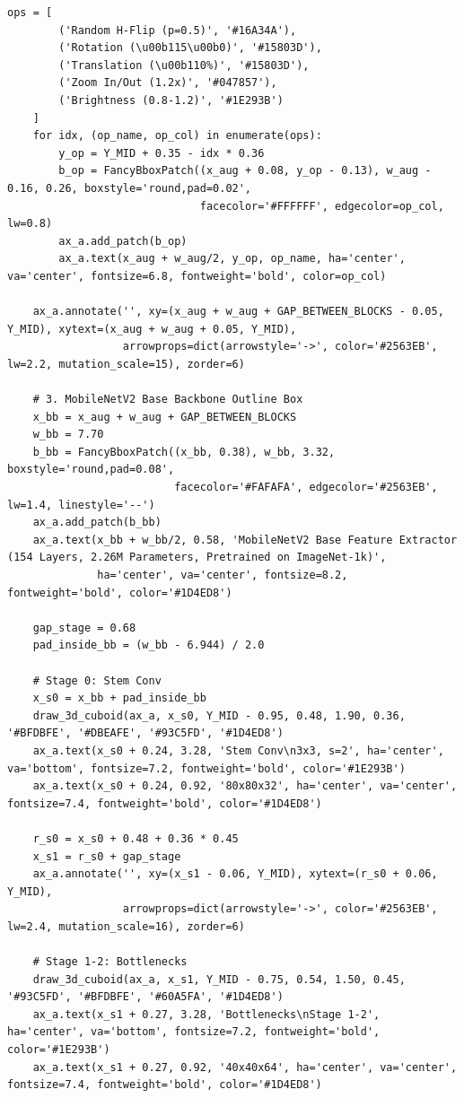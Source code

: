 \begin{lstlisting}[style=pycode]
    ops = [
        ('Random H-Flip (p=0.5)', '#16A34A'),
        ('Rotation (\u00b115\u00b0)', '#15803D'),
        ('Translation (\u00b110%)', '#15803D'),
        ('Zoom In/Out (1.2x)', '#047857'),
        ('Brightness (0.8-1.2)', '#1E293B')
    ]
    for idx, (op_name, op_col) in enumerate(ops):
        y_op = Y_MID + 0.35 - idx * 0.36
        b_op = FancyBboxPatch((x_aug + 0.08, y_op - 0.13), w_aug - 0.16, 0.26, boxstyle='round,pad=0.02',
                              facecolor='#FFFFFF', edgecolor=op_col, lw=0.8)
        ax_a.add_patch(b_op)
        ax_a.text(x_aug + w_aug/2, y_op, op_name, ha='center', va='center', fontsize=6.8, fontweight='bold', color=op_col)

    ax_a.annotate('', xy=(x_aug + w_aug + GAP_BETWEEN_BLOCKS - 0.05, Y_MID), xytext=(x_aug + w_aug + 0.05, Y_MID),
                  arrowprops=dict(arrowstyle='->', color='#2563EB', lw=2.2, mutation_scale=15), zorder=6)

    # 3. MobileNetV2 Base Backbone Outline Box
    x_bb = x_aug + w_aug + GAP_BETWEEN_BLOCKS
    w_bb = 7.70
    b_bb = FancyBboxPatch((x_bb, 0.38), w_bb, 3.32, boxstyle='round,pad=0.08',
                          facecolor='#FAFAFA', edgecolor='#2563EB', lw=1.4, linestyle='--')
    ax_a.add_patch(b_bb)
    ax_a.text(x_bb + w_bb/2, 0.58, 'MobileNetV2 Base Feature Extractor (154 Layers, 2.26M Parameters, Pretrained on ImageNet-1k)',
              ha='center', va='center', fontsize=8.2, fontweight='bold', color='#1D4ED8')

    gap_stage = 0.68
    pad_inside_bb = (w_bb - 6.944) / 2.0

    # Stage 0: Stem Conv
    x_s0 = x_bb + pad_inside_bb
    draw_3d_cuboid(ax_a, x_s0, Y_MID - 0.95, 0.48, 1.90, 0.36, '#BFDBFE', '#DBEAFE', '#93C5FD', '#1D4ED8')
    ax_a.text(x_s0 + 0.24, 3.28, 'Stem Conv\n3x3, s=2', ha='center', va='bottom', fontsize=7.2, fontweight='bold', color='#1E293B')
    ax_a.text(x_s0 + 0.24, 0.92, '80x80x32', ha='center', va='center', fontsize=7.4, fontweight='bold', color='#1D4ED8')

    r_s0 = x_s0 + 0.48 + 0.36 * 0.45
    x_s1 = r_s0 + gap_stage
    ax_a.annotate('', xy=(x_s1 - 0.06, Y_MID), xytext=(r_s0 + 0.06, Y_MID),
                  arrowprops=dict(arrowstyle='->', color='#2563EB', lw=2.4, mutation_scale=16), zorder=6)

    # Stage 1-2: Bottlenecks
    draw_3d_cuboid(ax_a, x_s1, Y_MID - 0.75, 0.54, 1.50, 0.45, '#93C5FD', '#BFDBFE', '#60A5FA', '#1D4ED8')
    ax_a.text(x_s1 + 0.27, 3.28, 'Bottlenecks\nStage 1-2', ha='center', va='bottom', fontsize=7.2, fontweight='bold', color='#1E293B')
    ax_a.text(x_s1 + 0.27, 0.92, '40x40x64', ha='center', va='center', fontsize=7.4, fontweight='bold', color='#1D4ED8')


\end{lstlisting}
